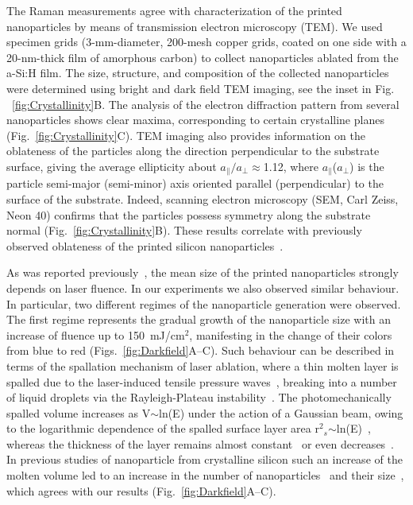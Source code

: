                 The Raman measurements agree with characterization of the printed nanoparticles by means of transmission electron
            microscopy (TEM). We used specimen grids (3-mm-diameter, 200-mesh copper grids, coated on one side with a 20-nm-thick
            film of amorphous carbon) to collect nanoparticles ablated from the a-Si:H film. The size, structure, and composition
            of the collected nanoparticles were determined using bright and dark field TEM imaging, see the inset in Fig.
            ~\ref{fig:Crystallinity}B. The analysis of the electron diffraction pattern from several nanoparticles shows clear maxima,
            corresponding to certain crystalline planes (Fig.~\ref{fig:Crystallinity}C).  TEM imaging also provides information
            on the oblateness of the particles along the direction perpendicular to the substrate surface, giving the average
            ellipticity about $a_{\parallel}/a_{\perp}\approx$1.12, where $a_{\parallel}$($a_{\perp}$) is the particle semi-major
            (semi-minor) axis oriented parallel (perpendicular) to the surface of the substrate. Indeed, scanning electron
            microscopy (SEM, Carl Zeiss, Neon 40) confirms that the particles possess  symmetry along the substrate
            normal (Fig.~\ref{fig:Crystallinity}B). These results correlate with previously observed oblateness of the printed silicon
            nanoparticles~\cite{zywietz2014laser}.

                As was reported previously~\cite{zywietz2014laser, zywietz2014generation}, the mean size of the printed nanoparticles
            strongly depends on laser fluence. In our experiments we also observed similar behaviour. In particular, two different
            regimes of the nanoparticle generation were observed. The first regime represents the gradual growth of the nanoparticle
            size with an increase of fluence up to 150~mJ/cm$^{2}$, manifesting in the change of their colors from blue to red
            (Figs.~\ref{fig:Darkfield}A--C). Such behaviour can be described in terms of the spallation mechanism of laser ablation, where
            a thin molten layer is spalled due to the laser-induced tensile pressure waves~\cite{ionin2013thermal,wu2014microscopic},
            breaking into a number of liquid droplets via the Rayleigh-Plateau instability~\cite{papageorgiou1995breakup}.
            The photomechanically spalled volume increases as V$\sim$ln(E) under the action of a Gaussian beam, owing to the
            logarithmic dependence of the spalled surface layer area r$^{2}$$_{s}$$\sim$ln(E)~\cite{bauerle2013laser}, whereas
            the thickness of the layer remains almost constant~\cite{ionin2013thermal} or even decreases~\cite{wu2014microscopic}.
            In previous studies of nanoparticle  from crystalline silicon such an increase of the molten volume led
            to an increase in the number of nanoparticles~\cite{zywietz2014generation} and their size~\cite{zywietz2014laser},
            which agrees with our results (Fig.~\ref{fig:Darkfield}A--C).

